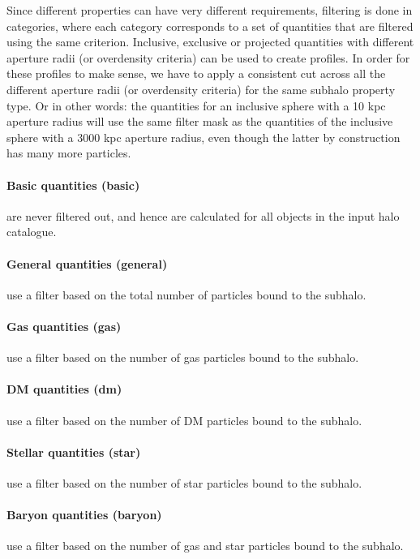 \documentclass{article}
\begin{document}
Since different properties can have very different requirements, filtering is done in categories, where each 
category corresponds to a set of quantities that are filtered using the same criterion. Inclusive, exclusive 
or projected quantities with different aperture radii (or overdensity criteria) can be used to create 
profiles. In order for these profiles to make sense, we have to apply a consistent cut across all the 
different aperture radii (or overdensity criteria) for the same subhalo property type. Or in other words: the 
quantities for an inclusive sphere with a 10 kpc aperture radius will use the same filter mask as the 
quantities of the inclusive sphere with a 3000 kpc aperture radius, even though the latter by construction has 
many more particles.

\paragraph{Basic quantities (basic)} are never filtered out, and hence are calculated for all objects in the
input halo catalogue.

\paragraph{General quantities (general)} use a filter based on the total number of particles bound to the 
subhalo.

\paragraph{Gas quantities (gas)} use a filter based on the number of gas particles bound to the subhalo. 

\paragraph{DM quantities (dm)} use a filter based on the number of DM particles bound to the subhalo.

\paragraph{Stellar quantities (star)} use a filter based on the number of star particles bound to the 
subhalo.

\paragraph{Baryon quantities (baryon)} use a filter based on the number of gas and star particles 
bound to the subhalo.
\end{document}
